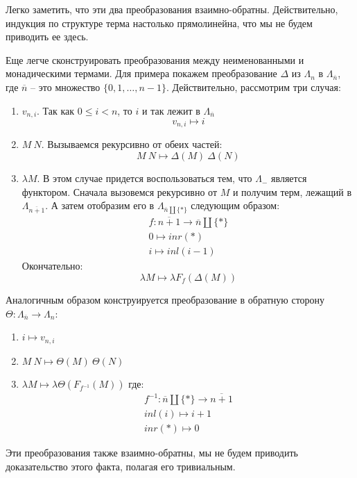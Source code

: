 Легко заметить, что эти два преобразования взаимно-обратны. Действительно, индукция по структуре терма настолько прямолинейна, что мы не будем приводить ее здесь.

Еще легче сконструировать преобразования между неименованными и монадическими термами. Для примера покажем преобразование $\Delta$ из $\Lambda_{n}$ в $\Lambda_{\overline{n}}$, где $\overline{n}$ -- это множество $\{0,1,\dots, n-1\}$. Действительно, рассмотрим три случая:

\begin{enumerate}
  \item $v_{n, i}$. Так как $0 \leqslant i < n$, то $i$ и так лежит в $\Lambda_{\overline{n}}$
  $$ v_{n,i} \mapsto i $$
  \item $M\ N$. Вызываемся рекурсивно от обеих частей:
    $$ M\ N \mapsto \Delta(M)\ \Delta(N) $$
  \item $\lambda M$. В этом случае придется воспользоваться тем, что $\Lambda_{-}$ является функтором. Сначала вызовемся рекурсивно от $M$ и получим терм, лежащий в $\Lambda_{\overline{n+1}}$. А затем отобразим его в $\Lambda_{\overline{n} \coprod \{*\}}$ следующим образом:
  \begin{gather*}
    f : \overline{n+1} \to \overline{n} \coprod \{*\}\\
    0 \mapsto inr(*) \\
    i \mapsto inl(i-1)
  \end{gather*}
  Окончательно:
  $$ \lambda M \mapsto \lambda F_{f}(\Delta(M))  $$
\end{enumerate}

Аналогичным образом конструируется преобразование в обратную сторону $\Theta : \Lambda_{\overline{n}} \to \Lambda_{n}$:

\begin{enumerate}
  \item $ i \mapsto v_{n, i} $
  \item $ M\ N \mapsto \Theta(M)\ \Theta(N) $
  \item $\lambda M \mapsto \lambda \Theta(F_{f^{-1}}(M))$
  где:
  \begin{gather*}
    f^{-1} : \overline{n} \coprod \{*\} \to \overline{n + 1} \\
    inl(i) \mapsto i + 1 \\
    inr(*) \mapsto 0
  \end{gather*}
\end{enumerate}

Эти преобразования также взаимно-обратны, мы не будем приводить доказательство этого факта, полагая его тривиальным.
